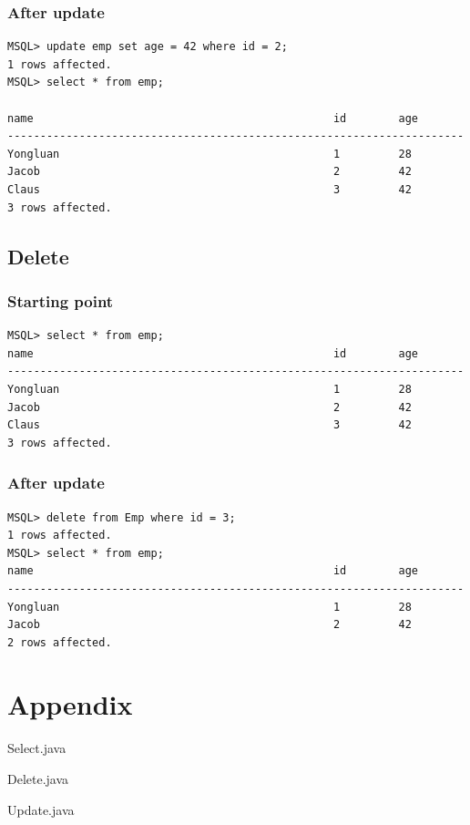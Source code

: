 \documentclass[a4paper,10pt,titlepage]{report}
\begin{document}
\subsubsection{After update}
\begin{lstlisting}
MSQL> update emp set age = 42 where id = 2;
1 rows affected.
MSQL> select * from emp;

name                                              id        age       
----------------------------------------------------------------------
Yongluan                                          1         28        
Jacob                                             2         42        
Claus                                             3         42        
3 rows affected.
\end{lstlisting}

\subsection{Delete}
\subsubsection{Starting point}
\begin{lstlisting}
MSQL> select * from emp;
name                                              id        age       
----------------------------------------------------------------------
Yongluan                                          1         28        
Jacob                                             2         42        
Claus                                             3         42        
3 rows affected.
\end{lstlisting}
\subsubsection{After update}

\begin{lstlisting}
MSQL> delete from Emp where id = 3;
1 rows affected.
MSQL> select * from emp;
name                                              id        age       
----------------------------------------------------------------------
Yongluan                                          1         28        
Jacob                                             2         42     
2 rows affected.  
\end{lstlisting}

\section{Appendix}
Select.java


Delete.java


Update.java

\end{document}
